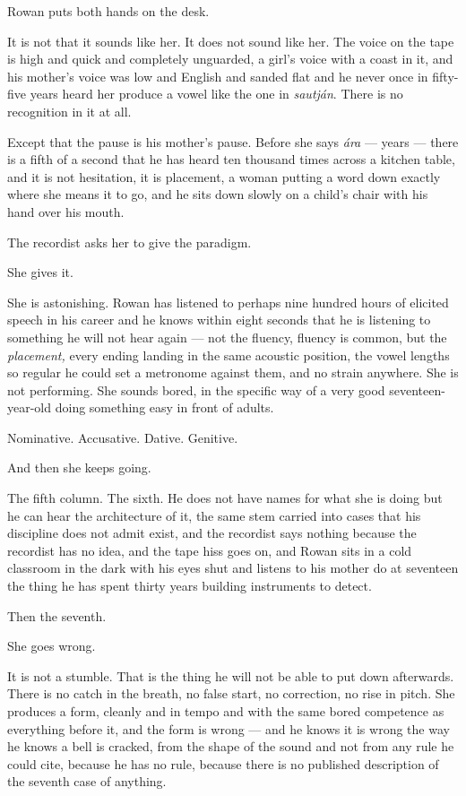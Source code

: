 \documentclass[11pt,oneside]{book}
\begin{document}
Rowan puts both hands on the desk.

It is not that it sounds like her. It does not sound like her. The voice
on the tape is high and quick and completely unguarded, a girl's voice
with a coast in it, and his mother's voice was low and English and
sanded flat and he never once in fifty-five years heard her produce a
vowel like the one in \emph{sautján}. There is no recognition in it at
all.

Except that the pause is his mother's pause. Before she says \emph{ára}
--- years --- there is a fifth of a second that he has heard ten
thousand times across a kitchen table, and it is not hesitation, it is
placement, a woman putting a word down exactly where she means it to go,
and he sits down slowly on a child's chair with his hand over his mouth.

The recordist asks her to give the paradigm.

She gives it.

She is astonishing. Rowan has listened to perhaps nine hundred hours of
elicited speech in his career and he knows within eight seconds that he
is listening to something he will not hear again --- not the fluency,
fluency is common, but the \emph{placement,} every ending landing in the
same acoustic position, the vowel lengths so regular he could set a
metronome against them, and no strain anywhere. She is not performing.
She sounds bored, in the specific way of a very good seventeen-year-old
doing something easy in front of adults.

Nominative. Accusative. Dative. Genitive.

And then she keeps going.

The fifth column. The sixth. He does not have names for what she is
doing but he can hear the architecture of it, the same stem carried into
cases that his discipline does not admit exist, and the recordist says
nothing because the recordist has no idea, and the tape hiss goes on,
and Rowan sits in a cold classroom in the dark with his eyes shut and
listens to his mother do at seventeen the thing he has spent thirty
years building instruments to detect.

Then the seventh.

She goes wrong.

It is not a stumble. That is the thing he will not be able to put down
afterwards. There is no catch in the breath, no false start, no
correction, no rise in pitch. She produces a form, cleanly and in
tempo and with the same bored competence as everything before it, and
the form is wrong --- and he knows it is wrong the way he knows a bell
is cracked, from the shape of the sound and not from any rule he could
cite, because he has no rule, because there is no published description
of the seventh case of anything.
\end{document}
